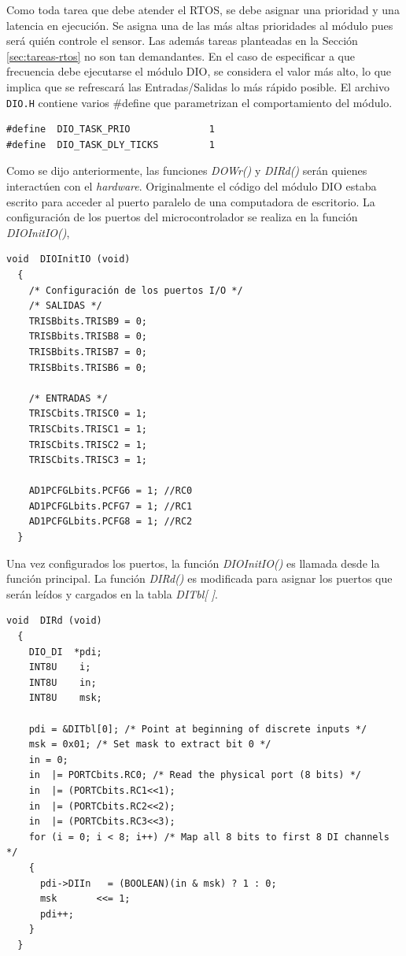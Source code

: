 \documentclass[11pt,a4paper,oneside]{article}
\begin{document}
Como toda tarea que debe atender el RTOS, se debe asignar una prioridad y una latencia en ejecución. Se asigna una de las más altas prioridades al módulo pues será quién controle el sensor. Las además tareas planteadas en la Sección \ref{sec:tareas-rtos} no son tan demandantes. En el caso de especificar a que frecuencia debe ejecutarse el módulo DIO, se considera el valor más alto, lo que implica que se refrescará las Entradas/Salidas lo más rápido posible. El archivo \texttt{DIO.H} contiene varios \#define que parametrizan el comportamiento del módulo.

\begin{lstlisting}[caption={Definiciones de parámetros de prioridad y latencia del Módulo DIO.}]
#define  DIO_TASK_PRIO              1
#define  DIO_TASK_DLY_TICKS         1
\end{lstlisting}

Como se dijo anteriormente, las funciones \emph{DOWr()} y \emph{DIRd()} serán quienes interactúen con el \textsl{hardware}. Originalmente el código del módulo DIO estaba escrito para acceder al puerto paralelo de una computadora de escritorio. La configuración de los puertos del microcontrolador se realiza en la función \emph{DIOInitIO()}, 
\begin{lstlisting}[caption={Función \emph{DIOInitIO()}},label=code:func-dioinitio]
  void  DIOInitIO (void)
  {
    /* Configuración de los puertos I/O */
    /* SALIDAS */
    TRISBbits.TRISB9 = 0;
    TRISBbits.TRISB8 = 0;
    TRISBbits.TRISB7 = 0;
    TRISBbits.TRISB6 = 0;

    /* ENTRADAS */
    TRISCbits.TRISC0 = 1;
    TRISCbits.TRISC1 = 1;
    TRISCbits.TRISC2 = 1;
    TRISCbits.TRISC3 = 1;

    AD1PCFGLbits.PCFG6 = 1;	//RC0
    AD1PCFGLbits.PCFG7 = 1;	//RC1
    AD1PCFGLbits.PCFG8 = 1;	//RC2
  }
\end{lstlisting}

Una vez configurados los puertos, la función \emph{DIOInitIO()} es llamada desde la función principal. La función \emph{DIRd()} es modificada para asignar los puertos que serán leídos y cargados en la tabla \emph{DITbl[ ]}.

\begin{lstlisting}[caption={Función \emph{DIRd()}},label=code:func-dird]
  void  DIRd (void)
  {
    DIO_DI  *pdi;
    INT8U    i;
    INT8U    in;
    INT8U    msk;
    
    pdi = &DITbl[0]; /* Point at beginning of discrete inputs */
    msk = 0x01; /* Set mask to extract bit 0 */
    in = 0;
    in  |= PORTCbits.RC0; /* Read the physical port (8 bits) */
    in  |= (PORTCbits.RC1<<1);           
    in  |= (PORTCbits.RC2<<2);
    in  |= (PORTCbits.RC3<<3);
    for (i = 0; i < 8; i++) /* Map all 8 bits to first 8 DI channels */
    {     
      pdi->DIIn   = (BOOLEAN)(in & msk) ? 1 : 0;
      msk       <<= 1;
      pdi++;
    }
  }
\end{lstlisting}
\end{document}
